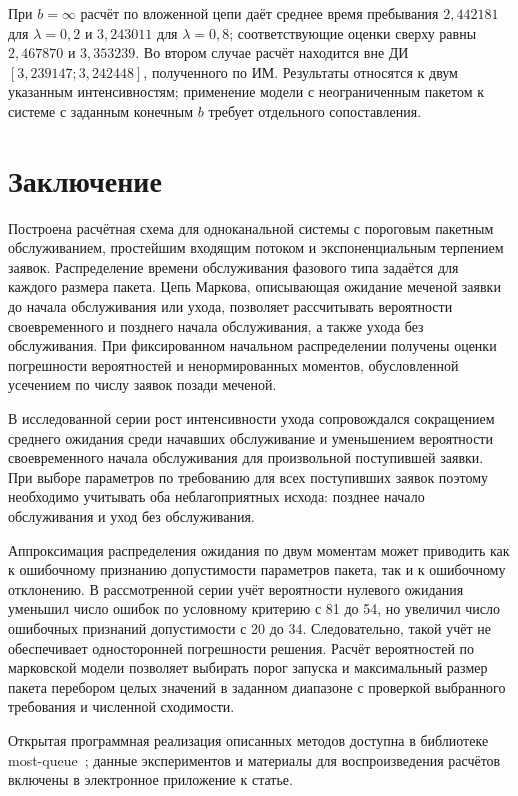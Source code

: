 При $b=\infty$ расчёт по вложенной цепи даёт среднее время пребывания $2{,}442181$ для $\lambda=0{,}2$ и $3{,}243011$ для $\lambda=0{,}8$; соответствующие оценки сверху равны $2{,}467870$ и $3{,}353239$. Во втором случае расчёт находится вне ДИ $[3{,}239147;3{,}242448]$, полученного по ИМ. Результаты относятся к двум указанным интенсивностям; применение модели с неограниченным пакетом к системе с заданным конечным $b$ требует отдельного сопоставления.

\section*{Заключение}

Построена расчётная схема для одноканальной системы с пороговым пакетным обслуживанием, простейшим входящим потоком и экспоненциальным терпением заявок. Распределение времени обслуживания фазового типа задаётся для каждого размера пакета. Цепь Маркова, описывающая ожидание меченой заявки до начала обслуживания или ухода, позволяет рассчитывать вероятности своевременного и позднего начала обслуживания, а также ухода без обслуживания. При фиксированном начальном распределении получены оценки погрешности вероятностей и ненормированных моментов, обусловленной усечением по числу заявок позади меченой.

В исследованной серии рост интенсивности ухода сопровождался сокращением среднего ожидания среди начавших обслуживание и уменьшением вероятности своевременного начала обслуживания для произвольной поступившей заявки. При выборе параметров по требованию для всех поступивших заявок поэтому необходимо учитывать оба неблагоприятных исхода: позднее начало обслуживания и уход без обслуживания.

Аппроксимация распределения ожидания по двум моментам может приводить как к ошибочному признанию допустимости параметров пакета, так и к ошибочному отклонению. В рассмотренной серии учёт вероятности нулевого ожидания уменьшил число ошибок по условному критерию с 81 до 54, но увеличил число ошибочных признаний допустимости с 20 до 34. Следовательно, такой учёт не обеспечивает односторонней погрешности решения. Расчёт вероятностей по марковской модели позволяет выбирать порог запуска и максимальный размер пакета перебором целых значений в заданном диапазоне с проверкой выбранного требования и численной сходимости.

Открытая программная реализация описанных методов доступна в библиотеке most-queue~\cite{mostqueue2026}; данные экспериментов и материалы для воспроизведения расчётов включены в электронное приложение к статье.
